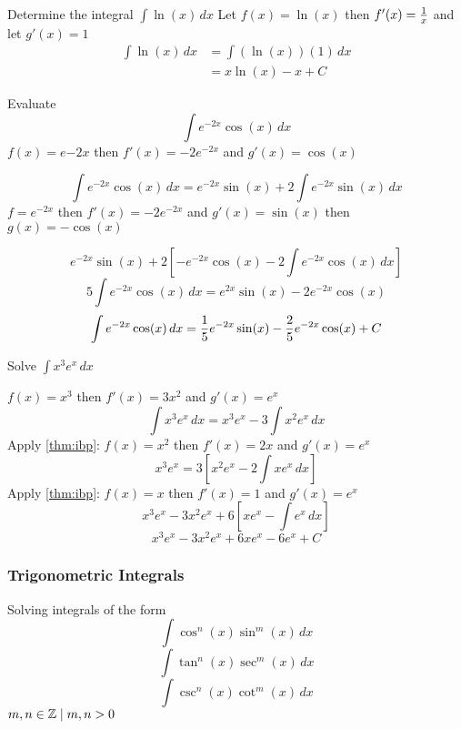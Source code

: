 \documentclass[english, 12pt]{article}
\begin{document}
\begin{exmp}
Determine the integral  $\int \ln(x)\,dx$
Let $f(x)=\ln(x)$ then $f'(x)=\frac{1}{x}$ and let $g'(x)=1$
\begin{align*}
\int \ln(x)\,dx &= \int (\ln(x))(1)\,dx\\
&= x \ln(x) - x + C
\end{align*}

\end{exmp}

\begin{exmp}
Evaluate 
\[ \int e^{-2x} \cos(x)\,dx\]
$f(x)= e{-2x}$ then $f'(x)= -2e^{-2x}$ and $g'(x) = \cos(x)$

\[\int e^{-2x} \cos(x)\,dx = e^{-2x} \sin(x)+ 2\int e^{-2x} \sin(x)\,dx\]
$f=e^{-2x}$ then $f'(x)=-2e^{-2x}$ and $g'(x)=\sin(x)$ then $g(x)=- \cos(x)$

\[e^{-2x} \sin(x) + 2[-e^{-2x} \cos(x) - 2 \int e^{-2x} \cos(x)\,dx ]\]
\[ 5\int e^{-2x} \cos(x)\,dx = e^{2x} \sin(x) - 2 e^{-2x} \cos(x)\]
\[ \int e^{-2x} \cos(x)\,dx = \frac{1}{5} e^{-2x} \sin(x) - \frac{2}{5} e^{-2x} \cos(x) + C \]
\end{exmp}

\begin{exmp}
Solve $\int x^3 e^x\,dx$
\begin{sol}
$f(x)=x^3$ then $f'(x)=3x^2$ and $g'(x)=e^x$
\[ \int x^3 e^x\,dx = x^3 e^x - 3 \int x^2 e^x \,dx \]
Apply \ref{thm:ibp}: $f(x)=x^2$ then $f'(x)=2x$ and $g'(x)=e^x$
\[ x^3 e^x = 3[x^2 e^x - 2 \int x e^x\,dx] \]
Apply \ref{thm:ibp}: $ f(x)=x$ then  $f'(x)=1$ and $g'(x)=e^x$
\[ x^3 e^x - 3x^2 e^x + 6[x e^x - \int e^x\,dx]\] 
\[ x^3 e^x - 3x^2 e^x + 6x e^x - 6e^x + C\]
\end{sol}
\end{exmp}
\subsubsection{Trigonometric Integrals}
Solving integrals of the form 
\[ \int \cos^n(x)\sin^m(x)\,dx\]
\[ \int \tan^n(x)\sec^m(x)\,dx \]
\[ \int \csc^n(x)\cot^m(x)\,dx \]
$m,n \in {\mathbb{Z}} \mid m,n>0$
\end{document}
